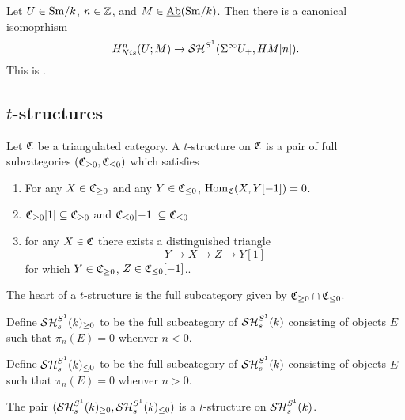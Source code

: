\documentclass{amsart}%
\begin{document}
\begin{proposition}
  Let $U \in \mathrm{Sm}/k$, $n\in \mathbb{Z}$, and $M \in \operatorname{\underline{Ab}}(\mathrm{Sm}/k)$. Then there
  is a canonical isomoprhism
  \begin{equation*}
    H^n_{Nis}(U; M) \to \mathcal{SH}^{S^1}(\Sigma^{\infty}U_+, HM[n]).
  \end{equation*}
  This is \cite[Lemma 3.2.3]{Mor05}.
\end{proposition}

\subsection{$t$-structures}

\begin{definition}
  Let $\mathfrak{C}$ be a triangulated category. A $t$-structure on $\mathfrak{C}$
  is a pair of full subcategories $(\mathfrak{C}_{\geq 0}, \mathfrak{C}_{\leq 0})$
  which satisfies 
  \begin{enumerate}
      \item For any $X \in \mathfrak{C}_{\geq 0}$ and any
    $ Y \in \mathfrak{C}_{\leq 0}$, $\operatorname{Hom}_{\mathfrak{C}}(X, Y[-1])=0$.
      \item $\mathfrak{C}_{\geq 0}[1] \subseteq \mathfrak{C}_{\geq 0}$ and
    $\mathfrak{C}_{\leq 0}[-1] \subseteq \mathfrak{C}_{\leq 0}$

      \item for any $X \in \mathfrak{C}$ there exists a distinguished triangle 
    \begin{equation*}
      Y \to X \to Z \to Y[1]
    \end{equation*}
    for which $Y \in \mathfrak{C}_{\geq 0}$, $Z\in \mathfrak{C}_{\leq 0}[-1]$..
  \end{enumerate}

  The heart of a $t$-structure is the full subcategory given by
  $\mathfrak{C}_{\geq 0} \cap \mathfrak{C}_{\leq 0}$. 
\end{definition}

\begin{definition}%
  Define $\mathcal{SH}_s^{S^1}(k)_{\geq 0}$ to be the full subcategory of
  $\mathcal{SH}_s^{S^1}(k)$ consisting of objects $E$ such that $\pi_n(E)=0$
  whenver $n<0$.
  
  Define $\mathcal{SH}_s^{S^1}(k)_{\leq 0}$ to be the full subcategory of
  $\mathcal{SH}_s^{S^1}(k)$ consisting of objects $E$ such that $\pi_n(E)=0$
  whenver $n>0$.
\end{definition}

\begin{theorem}
  The pair $(\mathcal{SH}_s^{S^1}(k)_{\geq 0}, \mathcal{SH}_s^{S^1}(k)_{\leq 0})$ is a
  $t$-structure on $\mathcal{SH}_s^{S^1}(k)$.
\end{theorem}
\end{document}
